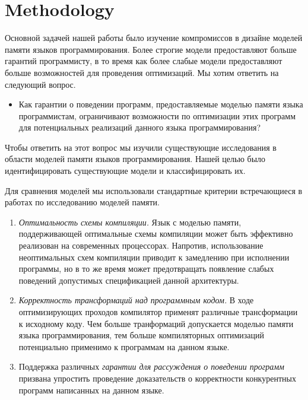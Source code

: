\section{Methodology}
\label{sec:methodology}

Основной задачей нашей работы было изучение
компромиссов в дизайне моделей памяти 
языков программирования. 
Более строгие модели предоставляют больше гарантий программисту,
в то время как более слабые модели предоставляют 
больше возможностей для проведения оптимизаций. 
Мы хотим ответить на следующий вопрос. 

\begin{itemize}
  \item Как гарантии о поведении программ, 
    предоставляемые моделью памяти языка программистам, 
    ограничивают возможности по оптимизации этих программ
    для потенциальных реализаций данного языка программирования?
\end{itemize}

Чтобы ответить на этот вопрос мы изучили существующие исследования 
в области моделей памяти языков программирования.
Нашей целью было идентифицировать существующие модели и классифицировать их.

Для сравнения моделей мы использовали стандартные критерии
встречающиеся в работах по исследованию моделей памяти. 

\begin{enumerate}[label=\textbf{C.\arabic*}]
  
  \item \label{item:criteria:opt-comp}
    \emph{Оптимальность схемы компиляции.}
    Язык с моделью памяти, поддерживающей оптимальные 
    схемы компиляции может быть эффективно реализован
    на современных процессорах. 
    Напротив, использование неоптимальных схем компиляции
    приводит к замедлению при исполнении программы, 
    но в то же время может предотвращать появление 
    слабых поведений допустимых спецификацией данной архитектуры. 

  \item \label{item:criteria:sound-trans}
    \emph{Корректность трансформаций над программным кодом.} 
    В ходе оптимизирующих проходов компилятор
    применят различные трансформации к исходному коду. 
    Чем больше транформаций допускается моделью памяти языка программирования, 
    тем больше компиляторных оптимизаций потенциально применимо 
    к программам на данном языке. 

  \item \label{item:criteria:reasoning}
    Поддержка различных \emph{гарантии для рассуждения о поведении программ}
    призвана упростить проведение доказательств о корректности 
    конкурентных программ написанных на данном языке. 
  
\end{enumerate}


